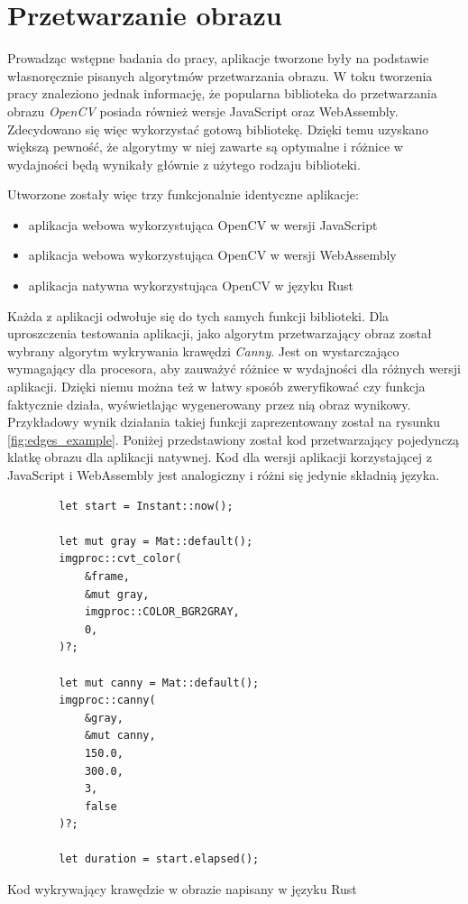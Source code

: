 \documentclass[language=polish,type=master]{aghmodern}
\begin{document}
\section{Przetwarzanie obrazu}
Prowadząc wstępne badania do pracy, aplikacje tworzone były na podstawie własnoręcznie pisanych algorytmów przetwarzania obrazu.
W toku tworzenia pracy znaleziono jednak informację, że popularna biblioteka do przetwarzania obrazu \emph{OpenCV}\footnotemark{} posiada również wersje JavaScript oraz WebAssembly.
Zdecydowano się więc wykorzystać gotową bibliotekę.
Dzięki temu uzyskano większą pewność, że algorytmy w niej zawarte są optymalne i różnice w wydajności będą wynikały głównie z użytego rodzaju biblioteki.

Utworzone zostały więc trzy funkcjonalnie identyczne aplikacje:
\begin{itemize}
    \item aplikacja webowa wykorzystująca OpenCV w wersji JavaScript
    \item aplikacja webowa wykorzystująca OpenCV w wersji WebAssembly
    \item aplikacja natywna wykorzystująca OpenCV w języku Rust
\end{itemize}

Każda z aplikacji odwołuje się do tych samych funkcji biblioteki.
Dla uproszczenia testowania aplikacji, jako algorytm przetwarzający obraz został wybrany algorytm wykrywania krawędzi \emph{Canny}\footnotemark{}.
Jest on wystarczająco wymagający dla procesora, aby zauważyć różnice w wydajności dla różnych wersji aplikacji.
Dzięki niemu można też w łatwy sposób zweryfikować czy funkcja faktycznie działa, wyświetlając wygenerowany przez nią obraz wynikowy.
Przykładowy wynik działania takiej funkcji zaprezentowany został na rysunku \ref{fig:edges_example}.
Poniżej przedstawiony został kod przetwarzający pojedynczą klatkę obrazu dla aplikacji natywnej.
Kod dla wersji aplikacji korzystającej z JavaScript i WebAssembly jest analogiczny i różni się jedynie składnią języka.

\begin{listing}[H]
    \begin{verbatim}
        let start = Instant::now();

        let mut gray = Mat::default();
        imgproc::cvt_color(
            &frame,
            &mut gray,
            imgproc::COLOR_BGR2GRAY,
            0,
        )?;

        let mut canny = Mat::default();
        imgproc::canny(
            &gray,
            &mut canny,
            150.0,
            300.0,
            3,
            false
        )?;

        let duration = start.elapsed();
    \end{verbatim}
    \caption{Kod wykrywający krawędzie w obrazie napisany w języku Rust}
\end{listing}
\end{document}
